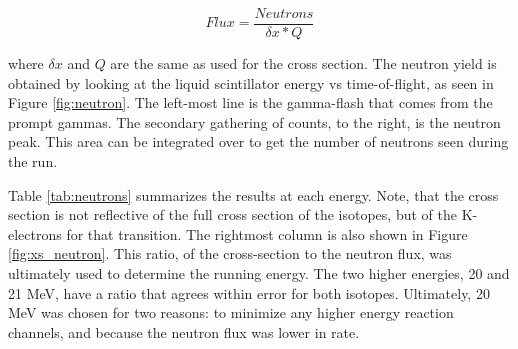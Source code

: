 \begin{equation}
    Flux = \frac{Neutrons}{\delta x*Q}
\end{equation}

where $\delta x$ and $Q$ are the same as used for the cross section. The neutron yield is obtained by looking at the liquid scintillator energy vs time-of-flight, as seen in Figure \ref{fig:neutron}. The left-most line is the gamma-flash that comes from the prompt gammas. The secondary gathering of counts, to the right, is the neutron peak. This area can be integrated over to get the number of neutrons seen during the run.

Table \ref{tab:neutrons} summarizes the results at each energy. Note, that the cross section is not reflective of the full cross section of the isotopes, but of the K-electrons for that transition. The rightmost column is also shown in Figure \ref{fig:xs_neutron}. This ratio, of the cross-section to the neutron flux, was ultimately used to determine the running energy. The two higher energies, 20 and 21 MeV, have a ratio that agrees within error for both isotopes. Ultimately, 20 MeV was chosen for two reasons: to minimize any higher energy reaction channels, and because the neutron flux was lower in rate.



%
% 
% 
